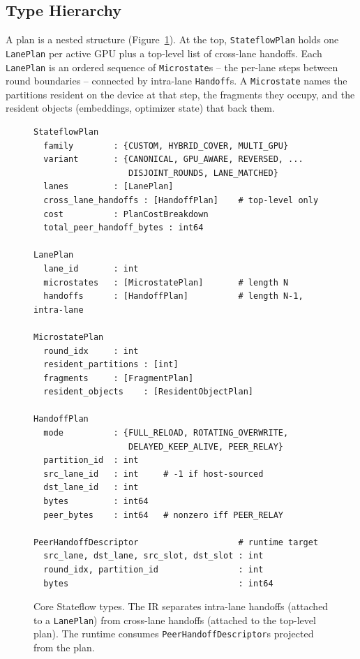\subsection{Type Hierarchy}\label{sec:ir:types}

A plan is a nested structure (Figure~\ref{fig:ir:types}). At the top,
\texttt{StateflowPlan} holds one \texttt{LanePlan} per active GPU plus
a top-level list of cross-lane handoffs. Each \texttt{LanePlan} is an
ordered sequence of \texttt{Microstate}s -- the per-lane steps between
round boundaries -- connected by intra-lane \texttt{Handoff}s. A
\texttt{Microstate} names the partitions resident on the device at that
step, the fragments they occupy, and the resident objects (embeddings,
optimizer state) that back them.

\begin{figure}[t]
\centering
\begin{lstlisting}[basicstyle=\ttfamily\footnotesize]
StateflowPlan
  family        : {CUSTOM, HYBRID_COVER, MULTI_GPU}
  variant       : {CANONICAL, GPU_AWARE, REVERSED, ...
                   DISJOINT_ROUNDS, LANE_MATCHED}
  lanes         : [LanePlan]
  cross_lane_handoffs : [HandoffPlan]    # top-level only
  cost          : PlanCostBreakdown
  total_peer_handoff_bytes : int64

LanePlan
  lane_id       : int
  microstates   : [MicrostatePlan]       # length N
  handoffs      : [HandoffPlan]          # length N-1, intra-lane

MicrostatePlan
  round_idx     : int
  resident_partitions : [int]
  fragments     : [FragmentPlan]
  resident_objects    : [ResidentObjectPlan]

HandoffPlan
  mode          : {FULL_RELOAD, ROTATING_OVERWRITE,
                   DELAYED_KEEP_ALIVE, PEER_RELAY}
  partition_id  : int
  src_lane_id   : int     # -1 if host-sourced
  dst_lane_id   : int
  bytes         : int64
  peer_bytes    : int64   # nonzero iff PEER_RELAY

PeerHandoffDescriptor                    # runtime target
  src_lane, dst_lane, src_slot, dst_slot : int
  round_idx, partition_id                : int
  bytes                                  : int64
\end{lstlisting}
\caption{Core Stateflow types. The IR separates intra-lane handoffs
(attached to a \texttt{LanePlan}) from cross-lane handoffs (attached to
the top-level plan). The runtime consumes \texttt{PeerHandoffDescriptor}s
projected from the plan.}
\label{fig:ir:types}
\end{figure}

